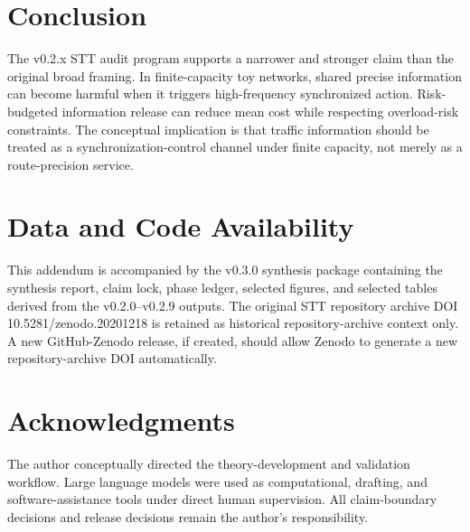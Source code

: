 \documentclass[11pt]{article}
\begin{document}
\section{Conclusion}
The v0.2.x STT audit program supports a narrower and stronger claim than the original broad framing. In finite-capacity toy networks, shared precise information can become harmful when it triggers high-frequency synchronized action. Risk-budgeted information release can reduce mean cost while respecting overload-risk constraints. The conceptual implication is that traffic information should be treated as a synchronization-control channel under finite capacity, not merely as a route-precision service.

\section*{Data and Code Availability}
This addendum is accompanied by the v0.3.0 synthesis package containing the synthesis report, claim lock, phase ledger, selected figures, and selected tables derived from the v0.2.0--v0.2.9 outputs. The original STT repository archive DOI 10.5281/zenodo.20201218 is retained as historical repository-archive context only. A new GitHub-Zenodo release, if created, should allow Zenodo to generate a new repository-archive DOI automatically.

\section*{Acknowledgments}
The author conceptually directed the theory-development and validation workflow. Large language models were used as computational, drafting, and software-assistance tools under direct human supervision. All claim-boundary decisions and release decisions remain the author's responsibility.
\end{document}

